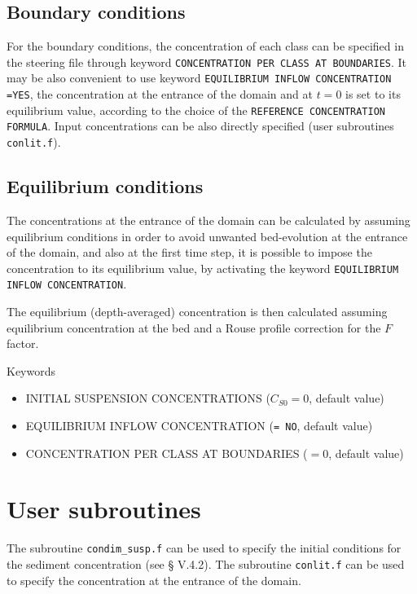 \subsection{Boundary conditions}
For the boundary conditions, the concentration of each class can be
specified in the steering file through keyword \texttt{CONCENTRATION PER CLASS AT
BOUNDARIES}. It may be also convenient to use keyword \texttt{EQUILIBRIUM INFLOW
CONCENTRATION =YES}, the concentration at the entrance of the domain and at
$t=0$ is set to its equilibrium value, according to the choice of the
\texttt{REFERENCE CONCENTRATION FORMULA}. Input concentrations can be also directly
specified (user subroutines \texttt{conlit.f}).

\subsection{Equilibrium conditions}
The concentrations at the entrance of the domain can be calculated by
\sisyphe assuming equilibrium conditions in order to avoid unwanted
bed-evolution at the entrance of the domain, and also at the first time
step, it is possible to impose the concentration to its equilibrium value,
by activating the keyword \texttt{EQUILIBRIUM INFLOW CONCENTRATION}.

The equilibrium (depth-averaged) concentration is then calculated assuming
equilibrium concentration at the bed and a Rouse profile correction for the
$F$ factor.

\medskip
\begin{bclogo}[couleur=blue!10,arrondi=0.1, logo=\bcinfo]{Keywords}
\begin{itemize}
\item {\ttfamily INITIAL SUSPENSION CONCENTRATIONS} ($C_{S0} = 0$,
default value)
\item {\ttfamily EQUILIBRIUM INFLOW CONCENTRATION} (\texttt{= NO}, default value)
\item {\ttfamily CONCENTRATION PER CLASS AT BOUNDARIES} ($=0$, default value)
\end{itemize}
\end{bclogo}

\section{User subroutines}

The subroutine \texttt{condim\_susp.f} can be used to specify the initial conditions
for the sediment concentration (see {\S } V.4.2). 
The subroutine \texttt{conlit.f} can be used to specify the concentration at the
entrance of the domain.


